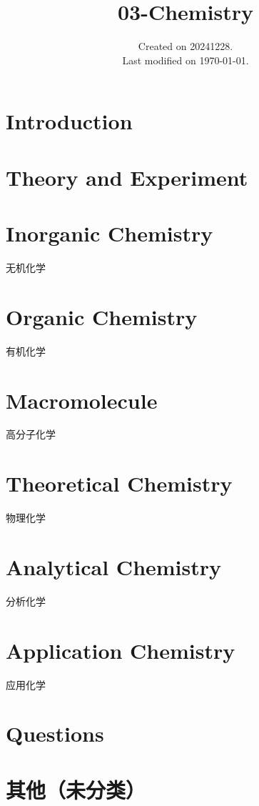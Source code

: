 \documentclass[UTF8]{03-Chemistry}
\begin{document}
\title{03-Chemistry}
\date{Created on 20241228.\\   Last modified on \today.}
\maketitle
\tableofcontents

\chapter{Introduction}



\chapter{Theory and Experiment}


\chapter{Inorganic Chemistry}
无机化学


\chapter{Organic Chemistry}
有机化学


\chapter{Macromolecule}
高分子化学


\chapter{Theoretical Chemistry}
物理化学


\chapter{Analytical  Chemistry}

分析化学


\chapter{Application  Chemistry}
应用化学



\chapter{Questions}

\chapter{其他（未分类）}
\end{document}
